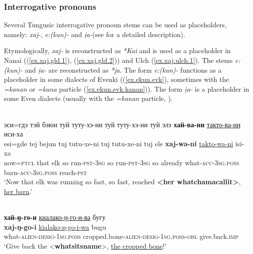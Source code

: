\documentclass[output=paper,colorlinks,citecolor=brown
\ChapterDOI{10.5281/zenodo.15697577}
]{langscibook}
\begin{document}
\subsubsection{Interrogative pronouns}


Several Tungusic interrogative pronoun stems can be used as placeholders, namely: \textit{xaj-}, \textit{e:(kun)-} and \textit{ịa-}(see \citealt[312--315]{holzl2018typology} for a detailed description).

Etymologically, \textit{xaj-} is reconstructed as \textit{*Kai} and is used as a placeholder in Nanai ((\ref{ex.xaj.gld.1}), (\ref{ex.xaj.gld.2})) and Ulch (\ref{ex.xaj.ulch.1}). The stems \textit{e:(kun)-} and \textit{ịa-} are reconstructed as \textit{*ja}. The form \textit{e:(kun)-} functions as a placeholder in some dialects of Evenki ((\ref{ex.ekun.evk}), sometimes with the \textit{=kanan} or \textit{=kana} particle (\ref{ex.ekun.evk.kanan})). The form \textit{ịa-} is a placeholder in some Even dialects (usually with the \textit{=kanan} particle, \citealt{matic2008}).



 \ea \label{ex.xaj.gld.1}
 \\
 \glll эси=гдэ тэй бэюн туй туту-хэ-ни туй туту-хэ-ни туй элэ \textbf{хай-ва-ни} \uline{такто-ва-ни} иси-ха\\
 esi=gde tej bejun tuj tutu-xe-ni tuj tutu-xe-ni tuj ele \textbf{xaj-wa-ni} \uline{takto-wa-ni} isi-xa\\
now=\textsc{ptcl} that elk so run-\textsc{pst}-\textsc{3sg} so run-\textsc{pst}-\textsc{3sg} so already what-\textsc{acc}-\textsc{3sg.poss} barn-\textsc{acc}-\textsc{3sg.poss} reach-\textsc{pst}\\
 \glt `Now that elk was running so fast, so fast, reached \textbf{<her whatchamacallit>}, \uline{her barn}.'
 \z
{}

 \ea \label{ex.xaj.gld.2}
 \\
 \glll \textbf{хай-ӈ-го-и} \uline{киалако-ӈ-го-и-ва} бугу\\
 \textbf{xaj-ŋ-go-i} \uline{kialako-ŋ-go-i-wa} bugu\\
what-\textsc{alien}-\textsc{desig}-\textsc{1sg.poss} cropped.bone-\textsc{alien}-\textsc{desig}-\textsc{1sg.poss}-\textsc{obl} give.back.\textsc{imp}\\
 \glt `Give back the <\textbf{whatsitsname}>, \uline{the cropped bone}!'
 
\end{document}

